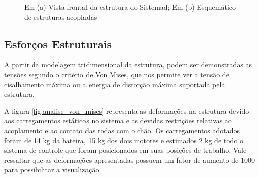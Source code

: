 \begin{figure}[!ht]
	\caption{Em (a) Vista frontal da estrutura do Sistemad; Em (b) Esquemático de estruturas acopladas}\label{fig:vista_frontal_e_esquematico_acoplamento}
\end{figure}

 \subsection{Esforços Estruturais}

 A partir da modelagem tridimensional da estrutura, podem ser demonstradas as tensões segundo o critério de Von Mises, que nos permite ver a tensão de cisalhamento máxima ou a energia de distorção máxima suportada pela estrutura.

 A figura \ref{fig:analise_von_mises} representa as deformações na estrutura devido aos carregamentos estáticos no sistema e as devidas restrições relativas ao acoplamento e ao contato das rodas com o chão. Os carregamentos adotados foram de 14 kg da bateira, 15 kg dos dois motores e estimados 2 kg de todo o sistema de controle que foram posicionados em suas posições de trabalho. Vale ressaltar que as deformações apresentadas possuem um fator de aumento de 1000 para possibilitar a visualização.

